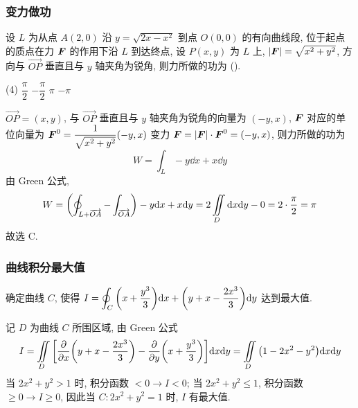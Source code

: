 \subsubsection{变力做功}

\begin{example}
    设 $L$ 为从点 $A(2,0)$ 沿 $y=\sqrt{2x-x^2}$ 到点 $O(0,0)$ 的有向曲线段, 位于起点的质点在力 $\vb*{F}$ 的作用下沿 $L$ 到达终点, 设 $P(x,y)$ 为 $L$ 上, $|\vb*{F}|=\sqrt{x^2+y^2}$, 方向与 $\overrightarrow{OP} $ 垂直且与 $y$ 轴夹角为锐角, 则力所做的功为 (\quad).
    \begin{tasks}(4)
        \task $\dfrac{\pi}{2}$
        \task $-\dfrac{\pi}{2}$
        \task $\pi$
        \task $-\pi$
    \end{tasks}
\end{example}
\begin{solution}
    $\overrightarrow{OP} =(x,y)$, 与 $\overrightarrow{OP} $ 垂直且与 $y$ 轴夹角为锐角的向量为 $(-y,x)$, $\vb*{F}$ 对应的单位向量为 $ \vb*{F}^0=\dfrac{1}{\sqrt{x^2+y^2}}(-y,x) $
    变力 $\vb*{F}=|\vb*{F}|\cdot \vb*{F}^0=(-y,x)$, 则力所做的功为
    $$
    W=\int_L-y \dd x+x \dd y
    $$
    由 Green 公式, 
    $$
    W=\qty(\oint_{L+\overrightarrow{OA}}-\int_{\overrightarrow{OA}})-y \dd x + x \dd y=2\iint\limits_D \dd x \dd y -0=2\cdot\dfrac{\pi}{2}=\pi
    $$
    故选 C.
\end{solution}

\subsubsection{曲线积分最大值}

\begin{example}
    确定曲线 $C$, 使得 $\displaystyle I=\oint_C\qty(x+\dfrac{y^3}{3})\dd x+\qty(y+x-\dfrac{2x^3}{3})\dd y$ 达到最大值.
\end{example}
\begin{solution}
    记 $D$ 为曲线 $C$ 所围区域, 由 Green 公式 $$
        I=\iint\limits_D\qty[\pdv{x}\qty(y+x-\dfrac{2x^3}{3})-\pdv{y}\qty(x+\dfrac{y^3}{3})]\dd x\dd y=\iint\limits_D\qty(1-2x^2-y^2)\dd x\dd y
    $$
    当 $2x^2+y^2>1$ 时, 积分函数 $<0\to I<0$; 当 $2x^2+y^2\leqslant 1$, 积分函数 $\geqslant 0\to I\geqslant 0$, 因此当 $C:2x^2+y^2=1$ 时, $I$ 有最大值.
\end{solution}

